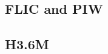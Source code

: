 \documentclass[runningheads]{llncs}
\begin{document}

\subsection{FLIC and PIW}




\subsection{H3.6M}


\end{document}
